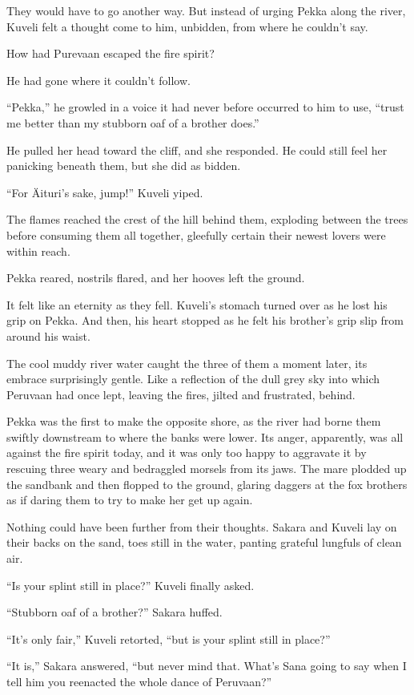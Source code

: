They would have to go another way. But instead of urging Pekka along the river, Kuveli felt a thought come to him, unbidden, from where he couldn't say.

How had Purevaan escaped the fire spirit?

He had gone where it couldn't follow.

``Pekka,'' he growled in a voice it had never before occurred to him to use, ``trust me better than my stubborn oaf of a brother does.''

He pulled her head toward the cliff, and she responded. He could still feel her panicking beneath them, but she did as bidden.

``For Äituri's sake, jump!'' Kuveli yiped.

The flames reached the crest of the hill behind them, exploding between the trees before consuming them all together, gleefully certain their newest lovers were within reach.

Pekka reared, nostrils flared, and her hooves left the ground.

It felt like an eternity as they fell. Kuveli's stomach turned over as he lost his grip on Pekka. And then, his heart stopped as he felt his brother's grip slip from around his waist.

The cool muddy river water caught the three of them a moment later, its embrace surprisingly gentle. Like a reflection of the dull grey sky into which Peruvaan had once lept, leaving the fires, jilted and frustrated, behind.

Pekka was the first to make the opposite shore, as the river had borne them swiftly downstream to where the banks were lower. Its anger, apparently, was all against the fire spirit today, and it was only too happy to aggravate it by rescuing three weary and bedraggled morsels from its jaws. The mare plodded up the sandbank and then flopped to the ground, glaring daggers at the fox brothers as if daring them to try to make her get up again.

Nothing could have been further from their thoughts. Sakara and Kuveli lay on their backs on the sand, toes still in the water, panting grateful lungfuls of clean air.

``Is your splint still in place?'' Kuveli finally asked.

``Stubborn oaf of a brother?'' Sakara huffed.

``It's only fair,'' Kuveli retorted, ``but is your splint still in place?''

``It is,'' Sakara answered, ``but never mind that. What's Sana going to say when I tell him you reenacted the whole dance of Peruvaan?''

